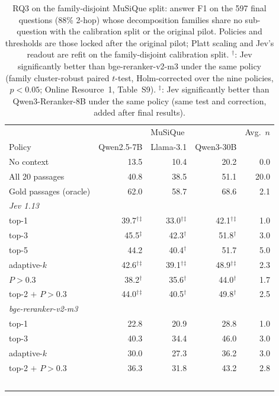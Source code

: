 \begin{table}[t]
\centering
\footnotesize
\setlength{\tabcolsep}{4pt}
\caption{RQ3 on the family-disjoint MuSiQue split: answer F1 on the 597 final questions (88\% 2-hop) whose decomposition families share no sub-question with the calibration split or the original pilot. Policies and thresholds are those locked after the original pilot; Platt scaling and Jev's readout are refit on the family-disjoint calibration split. $^\dagger$: Jev significantly better than bge-reranker-v2-m3 under the same policy (family cluster-robust paired $t$-test, Holm-corrected over the nine policies, $p<0.05$; Online Resource~1, Table~S9). $^\ddagger$: Jev significantly better than Qwen3-Reranker-8B under the same policy (same test and correction, added after final results).}
\label{tab:rag-fd}
\begin{tabular}{lrrrr}
\toprule
 & \multicolumn{3}{c}{MuSiQue} & Avg.\ $n$ \\
Policy & Qwen2.5-7B & Llama-3.1 & Qwen3-30B &  \\
\midrule
No context & 13.5 & 10.4 & 20.2 & 0.0 \\
All 20 passages & 40.8 & 38.5 & 51.1 & 20.0 \\
Gold passages (oracle) & 62.0 & 58.7 & 68.6 & 2.1 \\
\multicolumn{5}{l}{\textit{Jev 1.13}} \\
\quad top-1 & 39.7$^\dagger$$^\ddagger$ & 33.0$^\dagger$$^\ddagger$ & 42.1$^\dagger$$^\ddagger$ & 1.0 \\
\quad top-3 & 45.5$^\ddagger$ & 42.3$^\dagger$ & 51.8$^\dagger$ & 3.0 \\
\quad top-5 & 44.2 & 40.4$^\dagger$ & 51.7 & 5.0 \\
\quad adaptive-$k$ & 42.6$^\dagger$$^\ddagger$ & 39.1$^\dagger$$^\ddagger$ & 48.9$^\dagger$$^\ddagger$ & 2.3 \\
\quad $P>0.3$ & 38.2$^\dagger$ & 35.6$^\dagger$ & 44.0$^\dagger$ & 1.7 \\
\quad top-2 $+$ $P>0.3$ & 44.0$^\dagger$$^\ddagger$ & 40.5$^\dagger$ & 49.8$^\dagger$ & 2.5 \\
\multicolumn{5}{l}{\textit{bge-reranker-v2-m3}} \\
\quad top-1 & 22.8 & 20.9 & 28.8 & 1.0 \\
\quad top-3 & 40.3 & 34.4 & 46.0 & 3.0 \\
\quad adaptive-$k$ & 30.0 & 27.3 & 36.2 & 3.0 \\
\quad top-2 $+$ $P>0.3$ & 36.3 & 31.8 & 43.2 & 2.8 \\
$$
\end{tabular}
\end{table}

